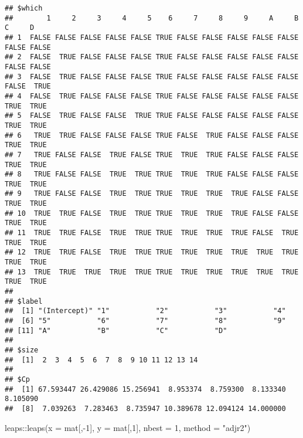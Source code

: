 \documentclass[
]{article}
\newenvironment{Shaded}{\begin{snugshade}}{\end{snugshade}}
\newcommand{\AttributeTok}[1]{\textcolor[rgb]{0.77,0.63,0.00}{#1}}
\newcommand{\DecValTok}[1]{\textcolor[rgb]{0.00,0.00,0.81}{#1}}
\newcommand{\FunctionTok}[1]{\textcolor[rgb]{0.00,0.00,0.00}{#1}}
\newcommand{\NormalTok}[1]{#1}
\newcommand{\SpecialCharTok}[1]{\textcolor[rgb]{0.00,0.00,0.00}{#1}}
\newcommand{\StringTok}[1]{\textcolor[rgb]{0.31,0.60,0.02}{#1}}
\begin{document}
\begin{verbatim}
## $which
##        1     2     3     4     5    6     7     8     9     A     B     C     D
## 1  FALSE FALSE FALSE FALSE FALSE TRUE FALSE FALSE FALSE FALSE FALSE FALSE FALSE
## 2  FALSE  TRUE FALSE FALSE FALSE TRUE FALSE FALSE FALSE FALSE FALSE FALSE FALSE
## 3  FALSE  TRUE FALSE FALSE FALSE TRUE FALSE FALSE FALSE FALSE FALSE FALSE  TRUE
## 4  FALSE  TRUE FALSE FALSE FALSE TRUE FALSE FALSE FALSE FALSE FALSE  TRUE  TRUE
## 5  FALSE  TRUE FALSE FALSE  TRUE TRUE FALSE FALSE FALSE FALSE FALSE  TRUE  TRUE
## 6   TRUE  TRUE FALSE FALSE FALSE TRUE FALSE  TRUE FALSE FALSE FALSE  TRUE  TRUE
## 7   TRUE FALSE FALSE  TRUE FALSE TRUE  TRUE  TRUE FALSE FALSE FALSE  TRUE  TRUE
## 8   TRUE FALSE FALSE  TRUE  TRUE TRUE  TRUE  TRUE FALSE FALSE FALSE  TRUE  TRUE
## 9   TRUE FALSE FALSE  TRUE  TRUE TRUE  TRUE  TRUE  TRUE FALSE FALSE  TRUE  TRUE
## 10  TRUE  TRUE FALSE  TRUE  TRUE TRUE  TRUE  TRUE  TRUE FALSE FALSE  TRUE  TRUE
## 11  TRUE  TRUE FALSE  TRUE  TRUE TRUE  TRUE  TRUE  TRUE FALSE  TRUE  TRUE  TRUE
## 12  TRUE  TRUE FALSE  TRUE  TRUE TRUE  TRUE  TRUE  TRUE  TRUE  TRUE  TRUE  TRUE
## 13  TRUE  TRUE  TRUE  TRUE  TRUE TRUE  TRUE  TRUE  TRUE  TRUE  TRUE  TRUE  TRUE
## 
## $label
##  [1] "(Intercept)" "1"           "2"           "3"           "4"          
##  [6] "5"           "6"           "7"           "8"           "9"          
## [11] "A"           "B"           "C"           "D"          
## 
## $size
##  [1]  2  3  4  5  6  7  8  9 10 11 12 13 14
## 
## $Cp
##  [1] 67.593447 26.429086 15.256941  8.953374  8.759300  8.133340  8.105090
##  [8]  7.039263  7.283463  8.735947 10.389678 12.094124 14.000000
\end{verbatim}

\begin{Shaded}
\begin{Highlighting}[]
\NormalTok{leaps}\SpecialCharTok{::}\FunctionTok{leaps}\NormalTok{(}\AttributeTok{x =}\NormalTok{ mat[,}\SpecialCharTok{{-}}\DecValTok{1}\NormalTok{], }\AttributeTok{y =}\NormalTok{ mat[,}\DecValTok{1}\NormalTok{], }\AttributeTok{nbest =} \DecValTok{1}\NormalTok{, }\AttributeTok{method =} \StringTok{"adjr2"}\NormalTok{)}
\end{Highlighting}
\end{Shaded}
\end{document}
